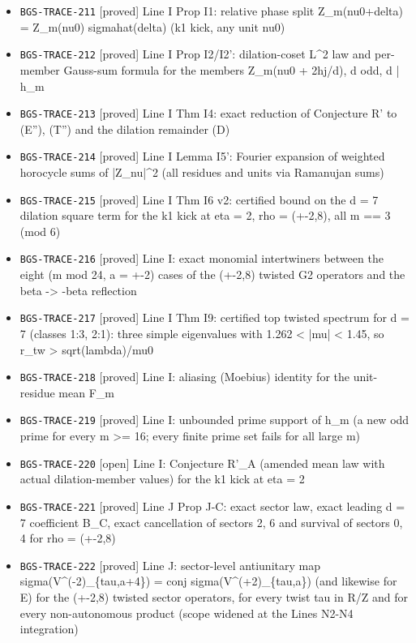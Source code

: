 \begin{itemize}
  \item \texttt{BGS-TRACE-211} [proved] Line I Prop I1: relative phase split Z\_m(nu0+delta) = Z\_m(nu0) sigmahat(delta) (k1 kick, any unit nu0)
  \item \texttt{BGS-TRACE-212} [proved] Line I Prop I2/I2': dilation-coset L\textasciicircum{}2 law and per-member Gauss-sum formula for the members Z\_m(nu0 + 2hj/d), d odd, d | h\_m
  \item \texttt{BGS-TRACE-213} [proved] Line I Thm I4: exact reduction of Conjecture R' to (E''), (T'') and the dilation remainder (D)
  \item \texttt{BGS-TRACE-214} [proved] Line I Lemma I5': Fourier expansion of weighted horocycle sums of |Z\_nu|\textasciicircum{}2 (all residues and units via Ramanujan sums)
  \item \texttt{BGS-TRACE-215} [proved] Line I Thm I6 v2: certified bound on the d = 7 dilation square term for the k1 kick at eta = 2, rho = (+-2,8), all m == 3 (mod 6)
  \item \texttt{BGS-TRACE-216} [proved] Line I: exact monomial intertwiners between the eight (m mod 24, a = +-2) cases of the (+-2,8) twisted G2 operators and the beta -> -beta reflection
  \item \texttt{BGS-TRACE-217} [proved] Line I Thm I9: certified top twisted spectrum for d = 7 (classes 1:3, 2:1): three simple eigenvalues with 1.262 < |mu| < 1.45, so r\_tw > sqrt(lambda)/mu0
  \item \texttt{BGS-TRACE-218} [proved] Line I: aliasing (Moebius) identity for the unit-residue mean F\_m
  \item \texttt{BGS-TRACE-219} [proved] Line I: unbounded prime support of h\_m (a new odd prime for every m >= 16; every finite prime set fails for all large m)
  \item \texttt{BGS-TRACE-220} [open] Line I: Conjecture R'\_A (amended mean law with actual dilation-member values) for the k1 kick at eta = 2
  \item \texttt{BGS-TRACE-221} [proved] Line J Prop J-C: exact sector law, exact leading d = 7 coefficient B\_C, exact cancellation of sectors 2, 6 and survival of sectors 0, 4 for rho = (+-2,8)
  \item \texttt{BGS-TRACE-222} [proved] Line J: sector-level antiunitary map sigma(V\textasciicircum{}(-2)\_\{tau,a+4\}) = conj sigma(V\textasciicircum{}(+2)\_\{tau,a\}) (and likewise for E) for the (+-2,8) twisted sector operators, for every twist tau in R/Z and for every non-autonomous product (scope widened at the Lines N2-N4 integration)

\end{itemize}
